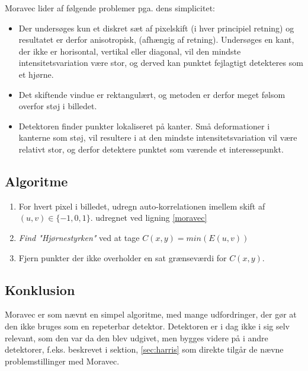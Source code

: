 Moravec lider af følgende problemer pga. dens simplicitet:
\begin{itemize}
\item{Der undersøges kun et diskret sæt af pixelskift (i hver principiel retning) og resultatet er derfor anisotropisk, (afhængig af retning). Undersøges en kant, der ikke er horisontal, vertikal eller diagonal, vil den mindste intensitetsvariation være stor, og derved kan punktet fejlagtigt detekteres som et hjørne.}
\item{Det skiftende vindue er rektangulært, og metoden er derfor meget følsom overfor støj i billedet.}
\item{Detektoren finder punkter lokaliseret på kanter. Små deformationer i kanterne som støj, vil resultere i at den mindste intensitetsvariation vil være relativt stor, og derfor detektere punktet som værende et interessepunkt.}
\end{itemize}
\subsection{Algoritme}
\begin{enumerate}
\item{For hvert pixel i billedet, udregn auto-korrelationen imellem skift af $(u,v) \in \lbrace-1,0,1\rbrace$. udregnet ved ligning \ref{moravec}}
\item{\textit{Find "Hjørnestyrken"} ved at tage $C(x,y)=min(E(u,v))$}
\item{Fjern punkter der ikke overholder en sat grænseværdi for $C(x,y)$.}
\end{enumerate}
\subsection{Konklusion}
Moravec er som nævnt en simpel algoritme, med mange udfordringer, der gør at den ikke bruges som en repeterbar detektor. Detektoren er i dag ikke i sig selv relevant, som den var da den blev udgivet, men bygges videre på i andre detektorer, f.eks. \cite{Harris} beskrevet i sektion, \ref{sec:harris} som direkte tilgår de nævne problemstillinger med Moravec.